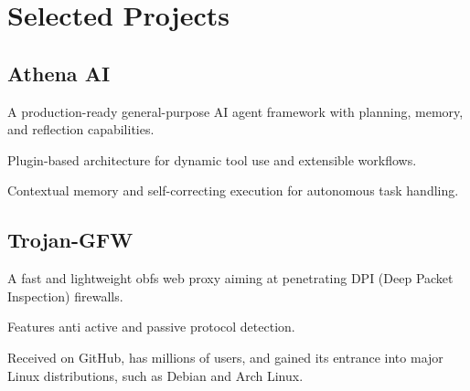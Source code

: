 \documentclass[]{deedy-resume-openfont}
\begin{document}
\begin{minipage}[t]{0.66\textwidth}

\section{Selected Projects}

\subsection{Athena AI}
\begin{tightemize}
\item A production-ready general-purpose AI agent framework with planning, memory, and reflection capabilities.
\item Plugin-based architecture for dynamic tool use and extensible workflows.
\item Contextual memory and self-correcting execution for autonomous task handling.
\end{tightemize}
\sectionsep

\subsection{Trojan-GFW}
\begin{tightemize}
\item A fast and lightweight obfs web proxy aiming at penetrating DPI (Deep Packet Inspection) firewalls.
\item Features anti active and passive protocol detection.
\item Received  on GitHub, has millions of users, and gained its entrance into major Linux distributions, such as Debian and Arch Linux.
\end{tightemize}
\sectionsep


\end{minipage}
\end{document}
